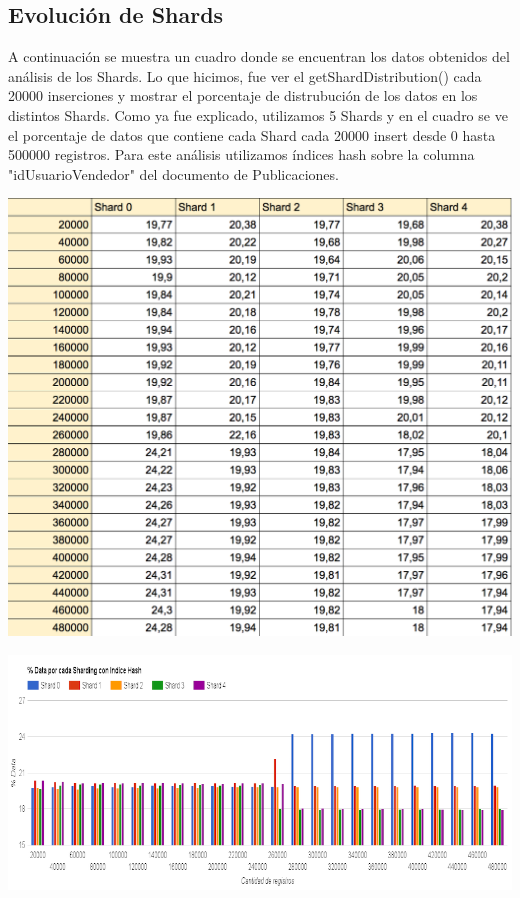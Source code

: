 \documentclass[a4paper, 10pt, twoside]{article}
\begin{document}
\subsection{Evoluci\'on de Shards}

A continuaci\'on se muestra un cuadro donde se encuentran los datos obtenidos del an\'alisis de los Shards. Lo que hicimos, fue ver el getShardDistribution() cada 20000 inserciones y mostrar el porcentaje de distrubuci\'on de los datos en los distintos Shards.
Como ya fue explicado, utilizamos 5 Shards y en el cuadro se ve el porcentaje de datos que contiene cada Shard cada 20000 insert desde 0 hasta 500000 registros.
Para este an\'alisis utilizamos \'indices hash sobre la columna "idUsuarioVendedor" del documento de Publicaciones.


\begin{center}
\includegraphics[scale=0.7]{resultado_indice_hash.png}
\end{center}
\includegraphics[scale=0.5]{indice_hash.png}
\end{document}
